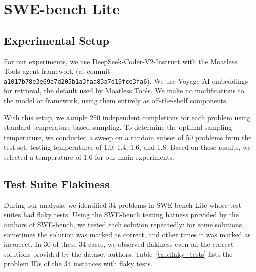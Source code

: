 \documentclass[11pt]{article}
\begin{document}
\newpage
\section{SWE-bench Lite}
\label{sec:swebench_details}

\subsection{Experimental Setup}

For our experiments, we use DeepSeek-Coder-V2-Instruct with the Moatless Tools agent framework (at commit \texttt{a1017b78e3e69e7d205b1a3faa83a7d19fce3fa6}).
We use Voyage AI \cite{voyage} embeddings for retrieval, the default used by Moatless Tools. We make no modifications to the model or framework, using them entirely as off-the-shelf components.

With this setup, we sample 250 independent completions for each problem using standard temperature-based sampling. To determine the optimal sampling temperature, we conducted a sweep on a random subset of 50 problems from the test set, testing temperatures of 1.0, 1.4, 1.6, and 1.8. Based on these results, we selected a temperature of 1.6 for our main experiments. 

\subsection{Test Suite Flakiness}

During our analysis, we identified 34 problems in SWE-bench Lite whose test suites had flaky tests. Using the SWE-bench testing harness provided by the authors of SWE-bench, we tested each solution repeatedly: for some solutions, sometimes the solution was marked as correct, and other times it was marked as incorrect. In 30 of these 34 cases, we observed flakiness even on the correct solutions provided by the dataset authors. Table~\ref{tab:flaky_tests} lists the problem IDs of the 34 instances with flaky tests.
\end{document}
